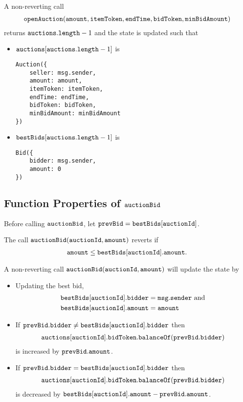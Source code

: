 \documentclass[a4paper,10pt]{article}
\begin{document}
A non-reverting call
\begin{align*}
\texttt{openAuction}(\texttt{amount}, \texttt{itemToken}, \texttt{endTime}, \texttt{bidToken}, \texttt{minBidAmount})
\end{align*}
returns $\texttt{auctions}.\texttt{length}-1$ and the state is updated such that

\begin{itemize}
\item $\texttt{auctions}[\texttt{auctions}.\texttt{length}-1]$ is
\begin{lstlisting}
Auction({
    seller: msg.sender,
    amount: amount,
    itemToken: itemToken,
    endTime: endTime,
    bidToken: bidToken,
    minBidAmount: minBidAmount
})
\end{lstlisting}
\item $\texttt{bestBids}[\texttt{auctions}.\texttt{length}-1]$ is
\begin{lstlisting}
Bid({
    bidder: msg.sender,
    amount: 0
})
\end{lstlisting}
\end{itemize}

\subsection*{Function Properties of $\texttt{auctionBid}$}

Before calling $\texttt{auctionBid}$, let $\texttt{prevBid} = \texttt{bestBids}[\texttt{auctionId}]$.

The call $\texttt{auctionBid}(\texttt{auctionId}, \texttt{amount})$ reverts if
\begin{align*}
\texttt{amount} \le \texttt{bestBids}[\texttt{auctionId}].\texttt{amount}\text{.}
\end{align*}

A non-reverting
call $\texttt{auctionBid}(\texttt{auctionId}, \texttt{amount})$ will update the state by
\begin{itemize}
\item Updating the best bid,
\begin{align*}
&\text{$\texttt{bestBids}[\texttt{auctionId}].\texttt{bidder} = \texttt{msg}.\texttt{sender}$ and} \\
&\text{$\texttt{bestBids}[\texttt{auctionId}].\texttt{amount} = \texttt{amount}$}
\end{align*}

\item If $\texttt{prevBid}.\texttt{bidder} \ne \texttt{bestBids}[\texttt{auctionId}].\texttt{bidder}$ then
\begin{align*}
\texttt{auctions}[\texttt{auctionId}].\texttt{bidToken}.\texttt{balanceOf}(\texttt{prevBid}.\texttt{bidder})
\end{align*}
is increased by
$\texttt{prevBid}.\texttt{amount}$.

\item If $\texttt{prevBid}.\texttt{bidder} = \texttt{bestBids}[\texttt{auctionId}].\texttt{bidder}$ then
\begin{align*}
\texttt{auctions}[\texttt{auctionId}].\texttt{bidToken}.\texttt{balanceOf}(\texttt{prevBid}.\texttt{bidder})
\end{align*}
is decreased by $\texttt{bestBids}[\texttt{auctionId}].\texttt{amount} - \texttt{prevBid}.\texttt{amount}$.
\end{itemize}
\end{document}
